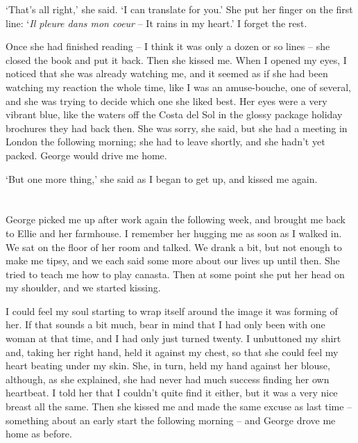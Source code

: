 `That's all right,' she said. `I can translate for you.' She put her finger on the first line: `\textit{Il pleure dans mon coeur} -- It rains in my heart.' I forget the rest.

Once she had finished reading -- I think it was only a dozen or so lines -- she closed the book and put it back. Then she kissed me. When I opened my eyes, I noticed that she was already watching me, and it seemed as if she had been watching my reaction the whole time, like I was an amuse-bouche, one of several, and she was trying to decide which one she liked best. Her eyes were a very vibrant blue, like the waters off the Costa del Sol in the glossy package holiday brochures they had back then. She was sorry, she said, but she had a meeting in London the following morning; she had to leave shortly, and she hadn't yet packed. George would drive me home.

`But one more thing,' she said as I began to get up, and kissed me again.

\section{}

George picked me up after work again the following week, and brought me back to Ellie and her farmhouse. I remember her hugging me as soon as I walked in. We sat on the floor of her room and talked. We drank a bit, but not enough to make me tipsy, and we each said some more about our lives up until then. She tried to teach me how to play canasta. Then at some point she put her head on my shoulder, and we started kissing.

I could feel my soul starting to wrap itself around the image it was forming of her. If that sounds a bit much, bear in mind that I had only been with one woman at that time, and I had only just turned twenty. I unbuttoned my shirt and, taking her right hand, held it against my chest, so that she could feel my heart beating under my skin. She, in turn, held my hand against her blouse, although, as she explained, she had never had much success finding her own heartbeat. I told her that I couldn't quite find it either, but it was a very nice breast all the same. Then she kissed me and made the same excuse as last time -- something about an early start the following morning -- and George drove me home as before.

\section{}

